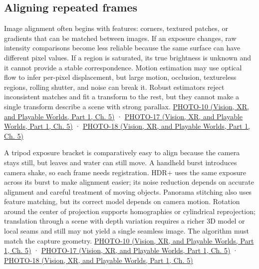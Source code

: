\subsection{Aligning repeated frames}\label{03-visual-computing-i-ch004-aligning-repeated-frames}

\hypertarget{03-visual-computing-i-ch004-aligning-repeated-frames}{}

Image alignment often begins with features: corners, textured patches, or gradients that can be matched between images. If an exposure changes, raw intensity comparisons become less reliable because the same surface can have different pixel values. If a region is saturated, its true brightness is unknown and it cannot provide a stable correspondence. Motion estimation may use optical flow to infer per-pixel displacement, but large motion, occlusion, textureless regions, rolling shutter, and noise can break it. Robust estimators reject inconsistent matches and fit a transform to the rest, but they cannot make a single transform describe a scene with strong parallax. \href{../07-Vision-XR-and-Playable-Worlds-P01/main.pdf\#nameddest=04-visual-computing-ii-ch036-photo-10---photography-session-10}{PHOTO-10 (Vision, XR, and Playable Worlds, Part 1, Ch. 5)} · \href{../07-Vision-XR-and-Playable-Worlds-P01/main.pdf\#nameddest=04-visual-computing-ii-ch036-photo-17---photography-session-17}{PHOTO-17 (Vision, XR, and Playable Worlds, Part 1, Ch. 5)} · \href{../07-Vision-XR-and-Playable-Worlds-P01/main.pdf\#nameddest=04-visual-computing-ii-ch036-photo-18---photography-session-18}{PHOTO-18 (Vision, XR, and Playable Worlds, Part 1, Ch. 5)}

A tripod exposure bracket is comparatively easy to align because the camera stays still, but leaves and water can still move. A handheld burst introduces camera shake, so each frame needs registration. HDR+ uses the same exposure across its burst to make alignment easier; its noise reduction depends on accurate alignment and careful treatment of moving objects. Panorama stitching also uses feature matching, but its correct model depends on camera motion. Rotation around the center of projection supports homographies or cylindrical reprojection; translation through a scene with depth variation requires a richer 3D model or local seams and still may not yield a single seamless image. The algorithm must match the capture geometry. \href{../07-Vision-XR-and-Playable-Worlds-P01/main.pdf\#nameddest=04-visual-computing-ii-ch036-photo-10---photography-session-10}{PHOTO-10 (Vision, XR, and Playable Worlds, Part 1, Ch. 5)} · \href{../07-Vision-XR-and-Playable-Worlds-P01/main.pdf\#nameddest=04-visual-computing-ii-ch036-photo-17---photography-session-17}{PHOTO-17 (Vision, XR, and Playable Worlds, Part 1, Ch. 5)} · \href{../07-Vision-XR-and-Playable-Worlds-P01/main.pdf\#nameddest=04-visual-computing-ii-ch036-photo-18---photography-session-18}{PHOTO-18 (Vision, XR, and Playable Worlds, Part 1, Ch. 5)}

